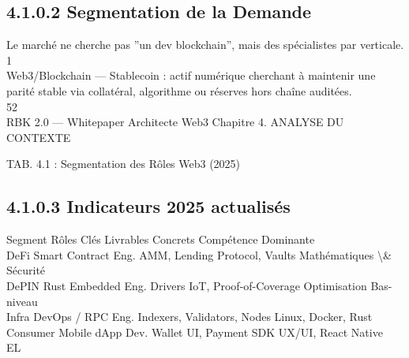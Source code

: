 \documentclass[12pt,landscape,a4paper]{article}
\begin{document}
\subsection{4.1.0.2 Segmentation de la Demande}
Le marché ne cherche pas ”un dev blockchain”, mais des spécialistes par verticale.\\
1\\
Web3/Blockchain — Stablecoin : actif numérique cherchant à maintenir une parité stable via collatéral, algorithme ou réserves hors chaîne auditées.\\
\vspace{0.5em}
\vspace{0.5em}
\vspace{0.5em}
\vspace{0.5em}
52\\
RBK 2.0 — Whitepaper Architecte Web3                                                                                           Chapitre 4. ANALYSE DU CONTEXTE\\
\vspace{0.5em}
\vspace{0.5em}
\begin{center}\begin{tabular}TAB. 4.1 : Segmentation des Rôles Web3 (2025)\end{tabular}\end{center}
\vspace{0.5em}
\vspace{0.5em}
\subsection{4.1.0.3 Indicateurs                                                                      2025                                                            actualisés}
\vspace{0.5em}
\vspace{0.5em}
Segment        Rôles Clés                Livrables Concrets                     Compétence Dominante\\
DeFi           Smart Contract Eng.       AMM, Lending Protocol, Vaults          Mathématiques \textbackslash{}& Sécurité\\
DePIN          Rust Embedded Eng.        Drivers IoT, Proof-of-Coverage         Optimisation Bas-niveau\\
Infra          DevOps / RPC Eng.         Indexers, Validators, Nodes            Linux, Docker, Rust\\
Consumer       Mobile dApp Dev.          Wallet UI, Payment SDK                 UX/UI, React Native\\
\vspace{0.5em}
\vspace{0.5em}
\vspace{0.5em}
\vspace{0.5em}
EL\\
\end{document}
